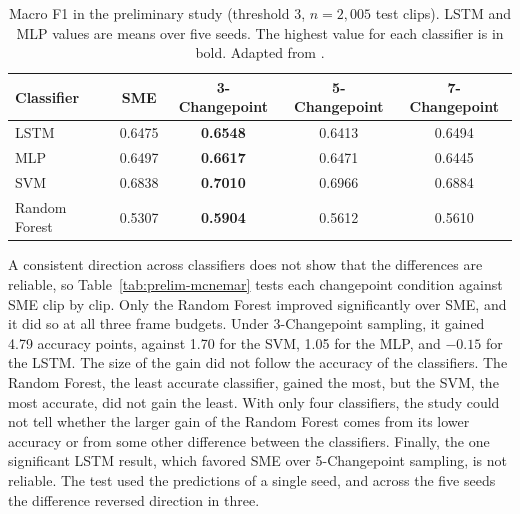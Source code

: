 \begin{table}[t]
   \centering
   \caption[Macro F1 in the preliminary study]{Macro F1 in the preliminary study (threshold 3, $n = 2{,}005$ test clips). LSTM and MLP values are means over five seeds. The highest value for each classifier is in bold. Adapted from .}
   \label{tab:prelim-f1}
   \begin{tabular}{lcccc}
      \toprule
      Classifier & SME & 3-Changepoint & 5-Changepoint & 7-Changepoint \\
      \midrule
      LSTM & 0.6475 & \textbf{0.6548} & 0.6413 & 0.6494 \\
      MLP & 0.6497 & \textbf{0.6617} & 0.6471 & 0.6445 \\
      SVM & 0.6838 & \textbf{0.7010} & 0.6966 & 0.6884 \\
      Random Forest & 0.5307 & \textbf{0.5904} & 0.5612 & 0.5610 \\
      \bottomrule
   \end{tabular}
\end{table}

A consistent direction across classifiers does not show that the differences are reliable, so Table~\ref{tab:prelim-mcnemar} tests each changepoint condition against SME clip by clip. Only the Random Forest improved significantly over SME, and it did so at all three frame budgets. Under 3-Changepoint sampling, it gained 4.79 accuracy points, against 1.70 for the SVM, 1.05 for the MLP, and $-0.15$ for the LSTM. The size of the gain did not follow the accuracy of the classifiers. The Random Forest, the least accurate classifier, gained the most, but the SVM, the most accurate, did not gain the least. With only four classifiers, the study could not tell whether the larger gain of the Random Forest comes from its lower accuracy or from some other difference between the classifiers. Finally, the one significant LSTM result, which favored SME over 5-Changepoint sampling, is not reliable. The test used the predictions of a single seed, and across the five seeds the difference reversed direction in three.

